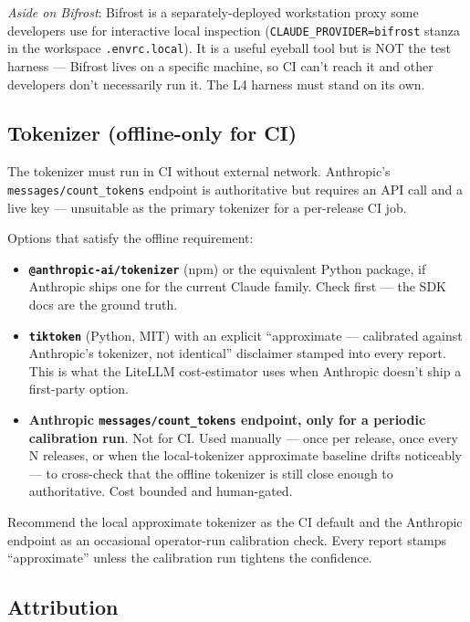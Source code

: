 \documentclass[a4paper,10pt]{article}
\newcommand{\pkg}[1]{\texttt{#1}}
\newcommand{\fpath}[1]{\texttt{#1}}
\begin{document}
\emph{Aside on Bifrost}: Bifrost is a separately-deployed workstation
proxy some developers use for interactive local inspection
(\texttt{CLAUDE\_PROVIDER=bifrost} stanza in the workspace
\fpath{.envrc.local}).  It is a useful eyeball tool but is NOT the
test harness --- Bifrost lives on a specific machine, so CI can't
reach it and other developers don't necessarily run it.  The L4
harness must stand on its own.

\subsection*{Tokenizer (offline-only for CI)}

The tokenizer must run in CI without external network.  Anthropic's
\texttt{messages/count\_tokens} endpoint is authoritative but
requires an API call and a live key --- unsuitable as the primary
tokenizer for a per-release CI job.

Options that satisfy the offline requirement:

\begin{itemize}
  \item \textbf{\pkg{@anthropic-ai/tokenizer}} (npm) or the
    equivalent Python package, if Anthropic ships one for the current
    Claude family.  Check first --- the SDK docs are the ground
    truth.
  \item \textbf{\pkg{tiktoken}} (Python, MIT) with an explicit
    ``approximate --- calibrated against Anthropic's tokenizer, not
    identical'' disclaimer stamped into every report.  This is what
    the LiteLLM cost-estimator uses when Anthropic doesn't ship a
    first-party option.
  \item \textbf{Anthropic \texttt{messages/count\_tokens} endpoint,
    only for a periodic calibration run}.  Not for CI.  Used
    manually --- once per release, once every N releases, or when
    the local-tokenizer approximate baseline drifts noticeably ---
    to cross-check that the offline tokenizer is still close enough
    to authoritative.  Cost bounded and human-gated.
\end{itemize}

Recommend the local approximate tokenizer as the CI default and the
Anthropic endpoint as an occasional operator-run calibration check.
Every report stamps ``approximate'' unless the calibration run
tightens the confidence.

\subsection*{Attribution}
\end{document}

